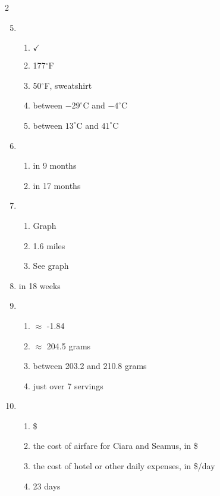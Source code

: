 \begin{multicols} {2}
\begin{enumerate}
\setcounter{enumi}{4}

\item %
\begin{enumerate}
\item $\checkmark$
\item 177$^\circ$F
\item 50$^\circ$F, sweatshirt
\item between $-29^\circ$C and $-4^\circ$C
\item between $13^\circ$C and $41^\circ$C
\end{enumerate}

\item %
\begin{enumerate}
\item in 9 months
\item in 17 months
\end{enumerate}

\item %
\begin{enumerate}
\item Graph
\item 1.6 miles
\item See graph
\end{enumerate}

\item %
in 18 weeks

\item %
\begin{enumerate}
\item $\approx$ -1.84
\item $\approx$ 204.5 grams
\item between 203.2 and 210.8 grams
\item just over 7 servings
\end{enumerate}

\item %
\begin{enumerate}
\item \$
\item the cost of airfare for Ciara and Seamus, in \$
\item the cost of hotel or other daily expenses, in \$/day 
\item 23 days
\end{enumerate}

\end{enumerate}
\end{multicols}

